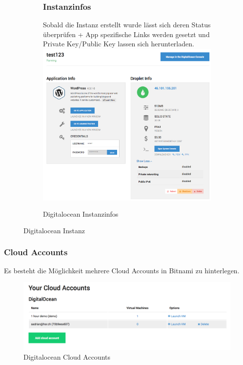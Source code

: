 \begin{figure}[!htbp]
\begin{subfigure}[b]{.49\textwidth}
  \subsubsection{Instanzinfos}
  Sobald die Instanz erstellt wurde lässt sich deren Status überprüfen + App spezifische 
Links werden gesetzt und Private Key/Public Key lassen sich herunterladen.\\
\includegraphics[width=\textwidth]{./03_Analyse/03_Bitnami/images/digitalocean_instanceinfo}
\caption{Digitalocean Instanzinfos}
\end{subfigure}
\caption{Digitalocean Instanz}
\end{figure}

\subsubsection{Cloud Accounts}
Es besteht die Möglichkeit mehrere Cloud Accounts in Bitnami zu hinterlegen.
\begin{figure}[!htbp]
\includegraphics[width=\textwidth]{./03_Analyse/03_Bitnami/images/digitalocean_accounts}
\caption{Digitalocean Cloud Accounts}
\end{figure}



